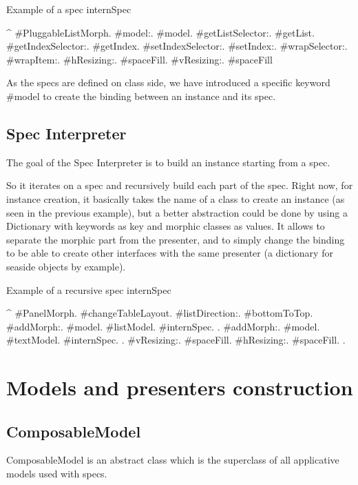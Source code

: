 \documentclass[a4paper,10pt,twoside]{book}
\begin{document}
\begin{method}{Example of a spec}
internSpec

	^ {#PluggableListMorph.
	    	#model:.			  	  #model.
			#getListSelector:.	  #getList.
			#getIndexSelector:.	#getIndex.
			#setIndexSelector:.	#setIndex:.
			#wrapSelector:.	  	 #wrapItem:.
			#hResizing:.			#spaceFill.
			#vResizing:.			#spaceFill		}
\end{method} 

As the specs are defined on class side, we have introduced a specific keyword \#model to create the binding between an instance and its spec.

\subsection{Spec Interpreter}

The goal of the Spec Interpreter is to build an instance starting from a spec.

So it iterates on a spec and recursively build each part of the spec.
Right now, for instance creation, it basically takes the name of a class to create an instance (as seen in the previous example), but a better abstraction could be done by using a Dictionary with keywords as key and morphic classes as values. It allows to separate the morphic part from the presenter, and to simply change the binding to be able to create other interfaces with the same presenter (a dictionary for seaside objects by example).

\begin{method}{Example of a recursive spec}
internSpec

	^	{  #PanelMorph.
			#changeTableLayout.
			#listDirection:. #bottomToTop.
			#addMorph:.   { #model. #listModel. #internSpec.	 }.
			#addMorph:.	  { #model. #textModel. #internSpec. 	}.
			#vResizing:. 	#spaceFill.
			#hResizing:. 	#spaceFill.	}.
\end{method} 

\section{Models and presenters construction}

\subsection{ComposableModel}

ComposableModel is an abstract class which is the superclass of all applicative models used with specs.
\end{document}
